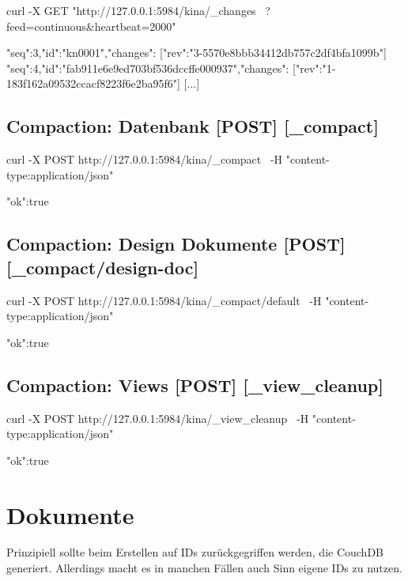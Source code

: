 \documentclass[19pt,landscape,twocolumn]{article}
\newcommand{\htmlverb}[1]{{[}\textbf{{#1}}{]}}
\newcommand{\setparskip}{\setlength{\parskip}{-6mm}}
\newcommand{\resetparskip}{\setlength{\parskip}{1mm}}
\begin{document}
\begin{code}
curl -X GET "http://127.0.0.1:5984/kina/_changes \
  ?feed=continuous&heartbeat=2000"
\end{code}
\setparskip
\begin{response}
{"seq":3,"id":"kn0001","changes":
  [{"rev":"3-5570e8bbb34412db757c2df4bfa1099b"}]}
{"seq":4,"id":"fab911e6e9ed703bf536dccffe000937","changes":
  [{"rev":"1-183f162a09532ccacf8223f6e2ba95f6"}]}
[...]
\end{response}
\resetparskip

\subsection{Compaction: Datenbank \htmlverb{POST} \htmlverb{\_compact}}

\begin{code}
curl -X POST http://127.0.0.1:5984/kina/_compact \
  -H "content-type:application/json"
\end{code}
\setparskip
\begin{response}
{"ok":true}
\end{response}
\resetparskip

\subsection{Compaction: Design Dokumente \htmlverb{POST} \htmlverb{\_compact/design-doc}}

\begin{code}
curl -X POST http://127.0.0.1:5984/kina/_compact/default \
  -H "content-type:application/json"
\end{code}
\setparskip
\begin{response}
{"ok":true}
\end{response}
\resetparskip

\subsection{Compaction: Views \htmlverb{POST} \htmlverb{\_view\_cleanup}}

\begin{code}
curl -X POST http://127.0.0.1:5984/kina/_view_cleanup \
  -H "content-type:application/json"
\end{code}
\setparskip
\begin{response}
{"ok":true}
\end{response}
\resetparskip

\section{Dokumente}
Prinzipiell sollte beim Erstellen auf IDs zurückgegriffen werden, die CouchDB 
generiert. Allerdings macht es in manchen Fällen auch Sinn eigene IDs zu nutzen.
\end{document}
